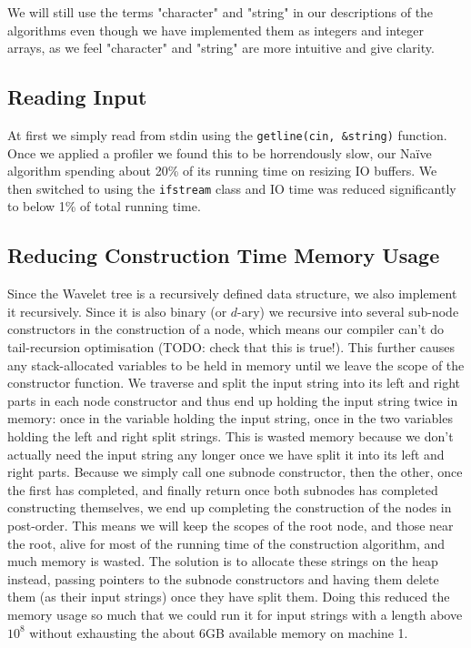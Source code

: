 We will still use the terms "character" and "string" in our descriptions of the algorithms even though we have implemented them as integers and integer arrays, as we feel "character" and "string" are more intuitive and give clarity.


\subsection{Reading Input}
At first we simply read from stdin using the \texttt{getline(cin, \&string)} function. Once we applied a profiler we found this to be horrendously slow, our Naïve algorithm spending about 20\% of its running time on resizing IO buffers. We then switched to using the \texttt{ifstream} class and IO time was reduced significantly to below 1\% of total running time.

\subsection{Reducing Construction Time Memory Usage}
Since the Wavelet tree is a recursively defined data structure, we also implement it recursively. Since it is also binary (or $d$-ary) we recursive into several sub-node constructors in the construction of a node, which means our compiler can't do tail-recursion optimisation (TODO: check that this is true!). This further causes any stack-allocated variables to be held in memory until we leave the scope of the constructor function.
We traverse and split the input string into its left and right parts in each node constructor and thus end up holding the input string twice in memory: once in the variable holding the input string, once in the two variables holding the left and right split strings.
This is wasted memory because we don't actually need the input string any longer once we have split it into its left and right parts.
Because we simply call one subnode constructor, then the other, once the first has completed, and finally return once both subnodes has completed constructing themselves, we end up completing the construction of the nodes in post-order.
This means we will keep the scopes of the root node, and those near the root, alive for most of the running time of the construction algorithm, and much memory is wasted.
The solution is to allocate these strings on the heap instead, passing pointers to the subnode constructors and having them delete them (as their input strings) once they have split them.
Doing this reduced the memory usage so much that we could run it for input strings with a length above $10^8$ without exhausting the about 6GB available memory on machine 1.

